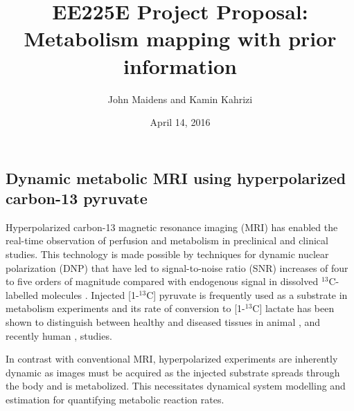 \documentclass{article}
\begin{document}
\title{EE225E Project Proposal: \\
Metabolism mapping with prior information 
}
\author{John Maidens and Kamin Kahrizi}
\date{April 14, 2016} 

\maketitle


\subsection{Dynamic metabolic MRI using hyperpolarized carbon-13 pyruvate}


Hyperpolarized carbon-13 magnetic resonance imaging (MRI) has enabled the real-time observation of perfusion and metabolism in preclinical and clinical studies. %
This technology is made possible by techniques for dynamic nuclear polarization (DNP) that have led to signal-to-noise ratio (SNR) increases of four to five orders of magnitude compared with endogenous signal in dissolved $^{13}$C-labelled molecules  \cite{Ardenkjaer-Larsen03, Golman03}.  Injected [1-$^{13}$C] pyruvate is frequently used as a substrate in metabolism experiments and its rate of conversion to  [1-$^{13}$C] lactate has been shown to distinguish between healthy and diseased tissues in animal \cite{Day07}, and recently human \cite{Nelson13}, studies. 

In contrast with conventional MRI, hyperpolarized experiments are inherently dynamic as images must be acquired as the injected substrate spreads through the body and is metabolized. This necessitates dynamical system modelling and estimation for quantifying metabolic reaction rates. 
\end{document}
